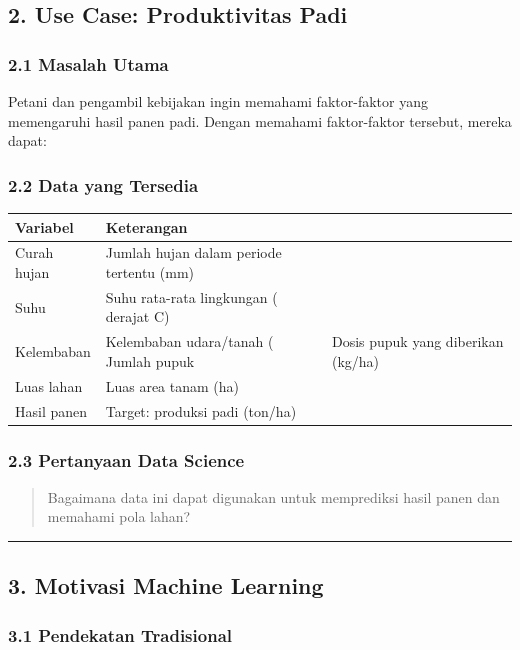 \documentclass[12pt,a4paper]{article}
\begin{document}
\subsection{2. Use Case: Produktivitas Padi}

\subsubsection{2.1 Masalah Utama}

Petani dan pengambil kebijakan ingin memahami faktor-faktor yang memengaruhi hasil panen padi. Dengan memahami faktor-faktor tersebut, mereka dapat:



\subsubsection{2.2 Data yang Tersedia}

\begin{tabular}{|l|l|}
\hline
Variabel & Keterangan \\
\hline
Curah hujan & Jumlah hujan dalam periode tertentu (mm) \\
\hline
Suhu & Suhu rata-rata lingkungan ( derajat C) \\
\hline
Kelembaban & Kelembaban udara/tanah (%
\hline
Jumlah pupuk & Dosis pupuk yang diberikan (kg/ha) \\
\hline
Luas lahan & Luas area tanam (ha) \\
\hline
Hasil panen & Target: produksi padi (ton/ha) \\
\hline
\end{tabular}


\subsubsection{2.3 Pertanyaan Data Science}

\begin{quote}
Bagaimana data ini dapat digunakan untuk memprediksi hasil panen dan memahami pola lahan?\end{quote}


\hrule


\subsection{3. Motivasi Machine Learning}

\subsubsection{3.1 Pendekatan Tradisional}
\end{document}
